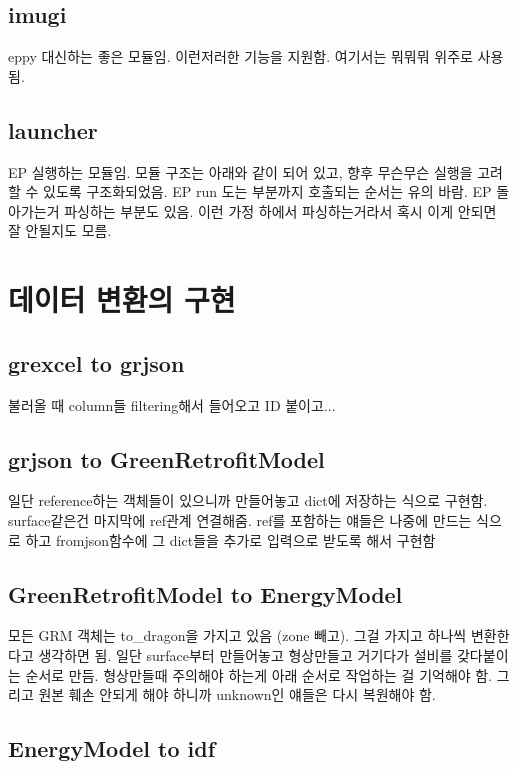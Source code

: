 \subsection{imugi}
eppy 대신하는 좋은 모듈임. 이런저러한 기능을 지원함. 여기서는 뭐뭐뭐 위주로 사용됨. 
\subsection{launcher}
EP 실행하는 모듈임. 모듈 구조는 아래와 같이 되어 있고, 향후 무슨무슨 실행을 고려할 수 있도록 구조화되었음. EP run 도는 부분까지 호출되는 순서는 유의 바람.
EP 돌아가는거 파싱하는 부분도 있음. 이런 가정 하에서 파싱하는거라서 혹시 이게 안되면 잘 안될지도 모름.


\section{데이터 변환의 구현}
\subsection{grexcel to grjson}
불러올 때 column들 filtering해서 들어오고 ID 붙이고...

\subsection{grjson to GreenRetrofitModel}
일단 reference하는 객체들이 있으니까 만들어놓고 dict에 저장하는 식으로 구현함. surface같은건 마지막에 ref관계 연결해줌. ref를 포함하는 얘들은 나중에 만드는 식으로 하고 fromjson함수에 그 dict들을 추가로 입력으로 받도록 해서 구현함

\subsection{GreenRetrofitModel to EnergyModel}
모든 GRM 객체는 to\_dragon을 가지고 있음 (zone 빼고). 그걸 가지고 하나씩 변환한다고 생각하면 됨. 일단 surface부터 만들어놓고 형상만들고 거기다가 설비를 갖다붙이는 순서로 만듬. 형상만들때 주의해야 하는게 아래 순서로 작업하는 걸 기억해야 함. 그리고 원본 훼손 안되게 해야 하니까 unknown인 얘들은 다시 복원해야 함.

\subsection{EnergyModel to idf}

